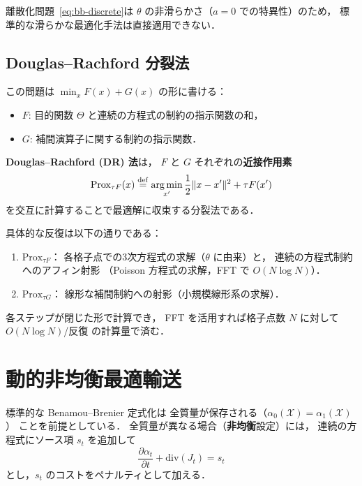 離散化問題~\eqref{eq:bb-discrete}は
$\theta$ の非滑らかさ（$a = 0$ での特異性）のため，
標準的な滑らかな最適化手法は直接適用できない．

\subsection{Douglas--Rachford 分裂法}\label{subsec:dr}

この問題は $\min_x F(x) + G(x)$ の形に書ける：
\begin{itemize}
  \item $F$: 目的関数 $\Theta$ と連続の方程式の制約の指示関数の和，
  \item $G$: 補間演算子に関する制約の指示関数．
\end{itemize}

\textbf{Douglas--Rachford (DR) 法}は，
$F$ と $G$ それぞれの\textbf{近接作用素}
\[
  \mathrm{Prox}_{\tau F}(x) \overset{\mathrm{def}}{=}
  \operatorname*{arg\,min}_{x'} \frac{1}{2}\|x - x'\|^2 + \tau F(x')
\]
を交互に計算することで最適解に収束する分裂法である．

具体的な反復は以下の通りである：
\begin{enumerate}
  \item $\mathrm{Prox}_{\tau F}$：
    各格子点での3次方程式の求解（$\theta$ に由来）と，
    連続の方程式制約へのアフィン射影
    （Poisson 方程式の求解，FFT で $O(N \log N)$）．
  \item $\mathrm{Prox}_{\tau G}$：
    線形な補間制約への射影（小規模線形系の求解）．
\end{enumerate}

各ステップが閉じた形で計算でき，
FFT を活用すれば格子点数 $N$ に対して
$O(N \log N)$/反復 の計算量で済む．


\section{動的非均衡最適輸送}\label{sec:dynamic-unbalanced}

標準的な Benamou--Brenier 定式化は
全質量が保存される（$\alpha_0(\mathcal{X}) = \alpha_1(\mathcal{X})$）
ことを前提としている．
全質量が異なる場合（\textbf{非均衡}設定）には，
連続の方程式にソース項 $s_t$ を追加して
\[
  \frac{\partial \alpha_t}{\partial t} + \mathrm{div}(J_t) = s_t
\]
とし，$s_t$ のコストをペナルティとして加える．


